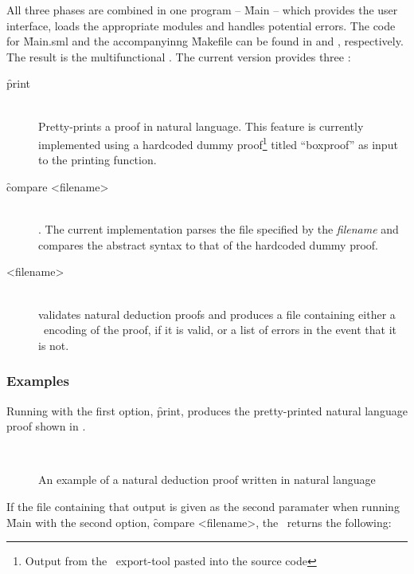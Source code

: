 \documentclass[BA.tex]{subfiles}
\begin{document}
 All three phases are combined in one program -- \f{Main} -- which provides
 the user interface, loads the appropriate modules and handles potential
 errors. The code for 
 \f{Main.sml} and the accompanyinng \f{Makefile} can be found in
  and , respectively. 
 The result is the multifunctional \tool . The current version provides
 three :
 \begin{description}
    \item[\f{print}] ~\\
 Pretty-prints a proof in natural language. This feature is currently
 implemented using a hardcoded dummy proof\footnote{Output 
 from the \bp\ export-tool pasted into the source code}
 titled ``boxproof'' as input to the printing function. 
    \item[\f{compare} <filename>] ~\\
 . The
 current implementation parses the file specified by the \emph{filename}
 and compares the abstract syntax to that of the hardcoded dummy proof.
    \item[<filename>] ~\\
 validates natural deduction 
 proofs and produces a file containing either a \bp\ encoding of the proof,
 if it is valid, or a list of errors in the event that it is not.
 \end{description}
 
\subsubsection{Examples}
 Running  with the first option, \f{print}, produces the 
 pretty-printed natural language proof shown in .

\begin{figure}[!ht]
~
\begin{subfigure}[t]{0.95\textwidth}
\footnotesize

\end{subfigure}
\caption[]{An example of a natural deduction proof written in natural 
language}
\label{nlprint}
\end{figure}

 If the file containing that output is given as the second paramater when
 running \f{Main} with the second option, \f{compare} <filename>, the
 \tool\ returns the following:

\end{document}
